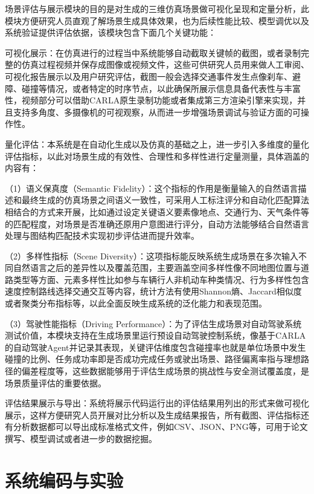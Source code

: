 场景评估与展示模块的目的是对生成的三维仿真场景做可视化呈现和定量分析，此模块方便研究人员直观了解场景生成具体效果，也为后续性能比较、模型调优以及系统验证提供评估依据，该模块包含下面几个关键功能：


	可视化展示：在仿真进行的过程当中系统能够自动截取关键帧的截图，或者录制完整的仿真过程视频并保存成图像或视频文件，这些可供研究人员用来做人工审阅、可视化报告展示以及用户研究评估，截图一般会选择交通事件发生点像刹车、避障、碰撞等情况，或者特定的时序节点，以此确保所展示信息具备代表性与丰富性，视频部分可以借助CARLA原生录制功能或者集成第三方渲染引擎来实现，并且支持多角度、多摄像机的可视观察，从而进一步增强场景调试与验证方面的可操作性。
	
	量化评估：本系统是在自动化生成以及仿真的基础之上，进一步引入多维度的量化评估指标，以此对场景生成的有效性、合理性和多样性进行定量测量，具体涵盖的内容有：
	
		（1）语义保真度（Semantic Fidelity）：这个指标的作用是衡量输入的自然语言描述和最终生成的仿真场景之间语义一致性，可采用人工标注评分和自动化匹配算法相结合的方式来开展，比如通过设定关键语义要素像地点、交通行为、天气条件等的匹配程度，对场景是否准确还原用户意图进行评分，自动方法能够结合自然语言处理与图结构匹配技术实现初步评估进而提升效率。
		
		
		（2）多样性指标（Scene Diversity）：这项指标能反映系统生成场景在多次输入不同自然语言之后的差异性以及覆盖范围，主要涵盖空间多样性像不同地图位置与道路类型等方面、元素多样性比如参与车辆行人非机动车种类情况、行为多样性包含速度控制路线选择交通交互等内容，统计方法有使用Shannon熵、Jaccard相似度或者聚类分布指标等，以此全面反映生成系统的泛化能力和表现范围。
		
		（3）驾驶性能指标（Driving Performance）：为了评估生成场景对自动驾驶系统测试价值，本模块支持在生成场景里运行预设自动驾驶控制系统，像基于CARLA的自动驾驶Agent并记录其表现，关键评估维度包含碰撞率也就是单位场景中发生碰撞的比例、任务成功率即是否成功完成任务或驶出场景、路径偏离率指与理想路径的偏差程度等，这些数据能够用于评估生成场景的挑战性与安全测试覆盖度，是场景质量评估的重要依据。
	
	评估结果展示与导出：系统将展示代码运行出的评估结果用列出的形式来做可视化展示，这样方便研究人员开展对比分析以及生成结果报告，所有截图、评估指标还有分析数据都可以导出成标准格式文件，例如CSV、JSON、PNG等，可用于论文撰写、模型调试或者进一步的数据挖掘。
	






\section{系统编码与实验}